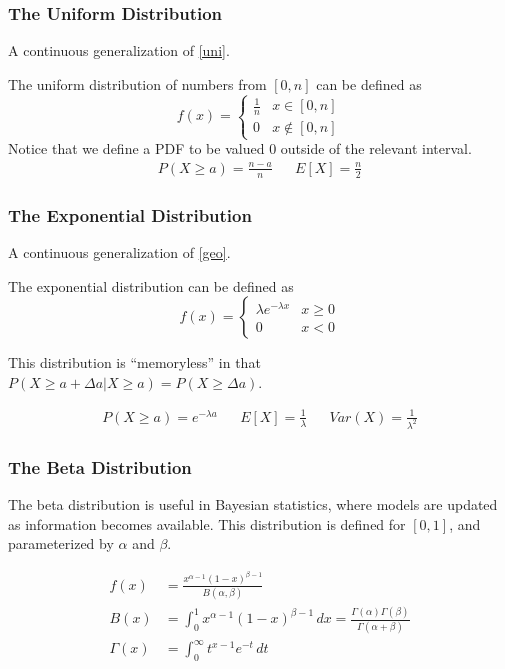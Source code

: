 \documentclass{article}
\begin{document}
\subsubsection{The Uniform Distribution}
A continuous generalization of \ref{uni}.

The uniform distribution of numbers from $[0, n]$ can be defined as
\[
    f(x) =
    \begin{cases}
        \frac{1}{n} & x \in [0,n] \\
        0 & x \notin [0,n]
    \end{cases}
\]
Notice that we define a PDF to be valued $0$ outside of the relevant interval.
\begin{align*}
    P(X\ge a)=\frac{n-a}{n} &&
    E[X] = \frac{n}{2}
\end{align*}

\subsubsection{The Exponential Distribution}
A continuous generalization of \ref{geo}.

The exponential distribution can be defined as
\[
    f(x) =
    \begin{cases}
        \lambda e^{-\lambda x} & x \ge 0 \\
        0 & x < 0
    \end{cases}
\]

This distribution is ``memoryless'' in that $P(X \ge a + \Delta a | X \ge a) = P(X \ge \Delta a)$.

\begin{align*}
   P(X\ge a) = e^{-\lambda a}&& E[X] = \frac{1}{\lambda} && Var(X) = \frac{1}{\lambda^2}
\end{align*}

\subsubsection{The Beta Distribution}
The beta distribution is useful in Bayesian statistics, where models are updated as information becomes available. This distribution is defined for $[0,1]$, and parameterized by $\alpha$ and $\beta$.

\begin{align*}
    f(x) &= \frac{x^{\alpha - 1}\left(1-x\right)^{\beta - 1}}{B(\alpha, \beta)}\\
    B(x) &= \int_0^1x^{\alpha-1}\left(1-x\right)^{\beta - 1}\,dx=\frac{\Gamma(\alpha)\Gamma(\beta)}{\Gamma(\alpha+\beta)}\\
    \Gamma(x) &= \int_0^\infty t^{x-1}e^{-t}\,dt
\end{align*}
\end{document}
